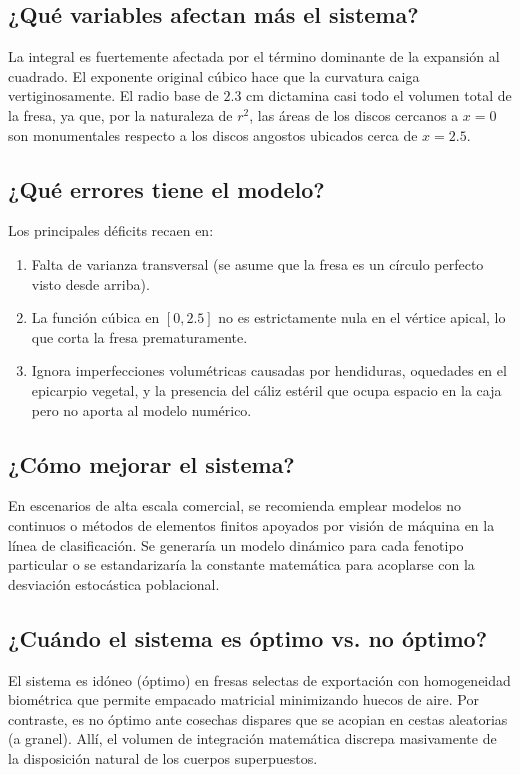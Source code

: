 \documentclass[conference, Spanish]{IEEEtran}
\begin{document}
\subsection{¿Qué variables afectan más el sistema?}
La integral es fuertemente afectada por el término dominante de la expansión al cuadrado. El exponente original cúbico hace que la curvatura caiga vertiginosamente. El radio base de $2.3$ cm dictamina casi todo el volumen total de la fresa, ya que, por la naturaleza de $r^2$, las áreas de los discos cercanos a $x=0$ son monumentales respecto a los discos angostos ubicados cerca de $x=2.5$.

\subsection{¿Qué errores tiene el modelo?}
Los principales déficits recaen en:
\begin{enumerate}
    \item Falta de varianza transversal (se asume que la fresa es un círculo perfecto visto desde arriba).
    \item La función cúbica en $[0, 2.5]$ no es estrictamente nula en el vértice apical, lo que corta la fresa prematuramente.
    \item Ignora imperfecciones volumétricas causadas por hendiduras, oquedades en el epicarpio vegetal, y la presencia del cáliz estéril que ocupa espacio en la caja pero no aporta al modelo numérico.
\end{enumerate}

\subsection{¿Cómo mejorar el sistema?}
En escenarios de alta escala comercial, se recomienda emplear modelos no continuos o métodos de elementos finitos apoyados por visión de máquina en la línea de clasificación. Se generaría un modelo dinámico para cada fenotipo particular o se estandarizaría la constante matemática para acoplarse con la desviación estocástica poblacional.

\subsection{¿Cuándo el sistema es óptimo vs. no óptimo?}
El sistema es idóneo (óptimo) en fresas selectas de exportación con homogeneidad biométrica que permite empacado matricial minimizando huecos de aire. Por contraste, es no óptimo ante cosechas dispares que se acopian en cestas aleatorias (a granel). Allí, el volumen de integración matemática discrepa masivamente de la disposición natural de los cuerpos superpuestos.
\end{document}
